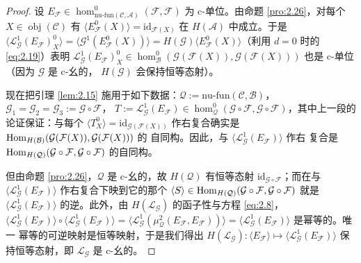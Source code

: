 \begin{proof}
设 $E_{\mathcal F}\in\hom^0_{\mathrm{nu\text{-}fun}(\mathcal C,\mathcal A)}
(\mathcal F,\mathcal F)$ 为 c-单位。由命题 \ref{pro:2.26}，对每个 $X\in\operatorname{obj}
(\mathcal C)$ 有 $\langle E^0_{\mathcal F}(X)\rangle=\mathrm{id}_{\mathcal F(X)}$
在 $H(\mathcal A)$ 中成立。于是 $\langle\mathcal L^1_{\mathcal G}(E_{\mathcal F})^0_X
\rangle=\langle\mathcal G^1(E^0_{\mathcal F}(X))\rangle=H(\mathcal G)\langle
E^0_{\mathcal F}(X)\rangle$（利用 $d=0$ 时的 \eqref{eq:2.19}）表明
$\mathcal L^1_{\mathcal G}(E_{\mathcal F})^0_X\in\hom^0_{\mathcal B}(\mathcal G
(\mathcal F(X)),\mathcal G(\mathcal F(X)))$ 也是 c-单位（因为 $\mathcal G$ 是 c-幺的，
$H(\mathcal G)$ 会保持恒等态射）。

现在把引理 \ref{lem:2.15} 施用于如下数据：$\mathcal Q:=\mathrm{nu\text{-}fun}(\mathcal C,
\mathcal B)$，$\mathcal G_1=\mathcal G_2=\mathcal G_3:=\mathcal G\circ\mathcal F$，
$T:=\mathcal L^1_{\mathcal G}(E_{\mathcal F})\in\hom^0_{\mathcal Q}(\mathcal G\circ
\mathcal F,\mathcal G\circ\mathcal F)$，其中上一段的论证保证：与每个
$\langle T^0_X\rangle=\mathrm{id}_{\mathcal G(\mathcal F(X))}$ 作右复合确实是
$\operatorname{Hom}_{H(\mathcal B)}(\mathcal G(\mathcal F(X)),\mathcal G(\mathcal F(X)))$ 的
自同构。因此，与 $\langle\mathcal L^1_{\mathcal G}(E_{\mathcal F})\rangle$ 作右
复合是 $\operatorname{Hom}_{H(\mathcal Q)}(\mathcal G\circ\mathcal F,\mathcal G\circ\mathcal F)$
的自同构。

但由命题 \ref{pro:2.26}，$\mathcal Q$ 是 c-幺的，故 $H(\mathcal Q)$ 有恒等态射
$\mathrm{id}_{\mathcal G\circ\mathcal F}$；而在与 $\langle\mathcal L^1_{\mathcal G}
(E_{\mathcal F})\rangle$ 作右复合下映到它的那个 $\langle S\rangle\in
\operatorname{Hom}_{H(\mathcal Q)}(\mathcal G\circ\mathcal F,\mathcal G\circ\mathcal F)$ 就是
$\langle\mathcal L^1_{\mathcal G}(E_{\mathcal F})\rangle$ 的逆。此外，由
$H(\mathcal L_{\mathcal G})$ 的函子性与方程 \eqref{eq:2.8}，
$\langle\mathcal L^1_{\mathcal G}(E_{\mathcal F})\rangle\circ
\langle\mathcal L^1_{\mathcal G}(E_{\mathcal F})\rangle=
\langle\mathcal L^1_{\mathcal G}(\mu^2_{\mathcal Q}(E_{\mathcal F},E_{\mathcal F}))
\rangle=\langle\mathcal L^1_{\mathcal G}(E_{\mathcal F})\rangle$ 是幂等的。唯一
幂等的可逆映射是恒等映射，于是我们得出 $H(\mathcal L_{\mathcal G}):\langle
E_{\mathcal F}\rangle\mapsto\langle\mathcal L^1_{\mathcal G}(E_{\mathcal F})\rangle$
保持恒等态射，即 $\mathcal L_{\mathcal G}$ 是 c-幺的。
\end{proof}

